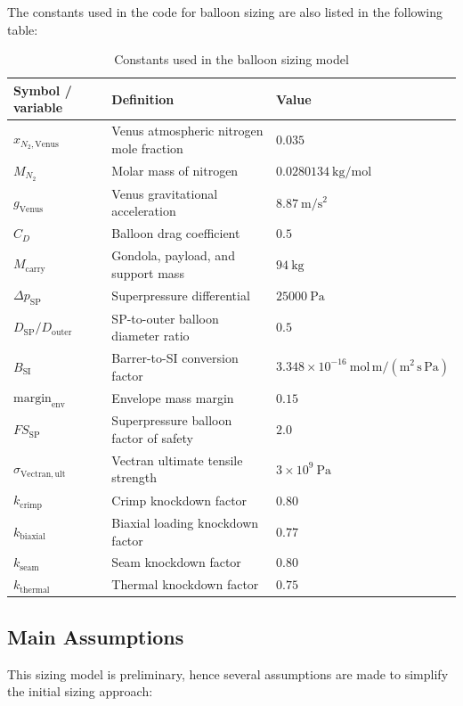 The constants used in the code for balloon sizing are also listed in the following table:

\begin{table}[H]
\centering
\caption{Constants used in the balloon sizing model}
\label{tab:balloon_sizing_constants}
\renewcommand{\arraystretch}{1}
\begin{tabular}{l l l}
\hline
\textbf{Symbol / variable} & \textbf{Definition} & \textbf{Value} \\
\hline
$x_{N_2,\mathrm{Venus}}$ & Venus atmospheric nitrogen mole fraction & $0.035$ \\
$M_{N_2}$ & Molar mass of nitrogen & $0.0280134~\mathrm{kg/mol}$ \\
$g_{\mathrm{Venus}}$ & Venus gravitational acceleration & $8.87~\mathrm{m/s^2}$ \\
$C_D$ & Balloon drag coefficient & $0.5$ \\
$M_{\mathrm{carry}}$ & Gondola, payload, and support mass & $94~\mathrm{kg}$ \\
$\Delta p_{\mathrm{SP}}$ & Superpressure differential & $25000~\mathrm{Pa}$ \\
$D_{\mathrm{SP}}/D_{\mathrm{outer}}$ & SP-to-outer balloon diameter ratio & $0.5$ \\
$B_{\mathrm{SI}}$ & Barrer-to-SI conversion factor & $3.348\times10^{-16}~\mathrm{mol\,m/(m^2\,s\,Pa)}$ \\
$\mathrm{margin}_{\mathrm{env}}$ & Envelope mass margin & $0.15$ \\
$FS_{\mathrm{SP}}$ & Superpressure balloon factor of safety & $2.0$ \\
$\sigma_{\mathrm{Vectran,ult}}$ & Vectran ultimate tensile strength & $3\times10^9~\mathrm{Pa}$ \\
$k_{\mathrm{crimp}}$ & Crimp knockdown factor & $0.80$ \cite{Hall2021}\\
$k_{\mathrm{biaxial}}$ & Biaxial loading knockdown factor & $0.77$ \\
$k_{\mathrm{seam}}$ & Seam knockdown factor & $0.80$ \\
$k_{\mathrm{thermal}}$ & Thermal knockdown factor & $0.75$ \\
\hline
\end{tabular}
\end{table}

\subsection*{Main Assumptions}
This sizing model is preliminary, hence several assumptions are made to simplify the initial sizing approach:


